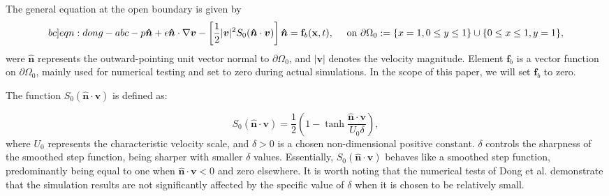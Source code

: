 \documentclass{article}
\numberwithin{equation}{section}
\begin{document}
The general equation at the open boundary is given  by
\begin{equation}\label[bc]{eqn:dong-abc}
-p \boldsymbol{\hat{n}}+\epsilon \boldsymbol{\hat{n}} \cdot \nabla \boldsymbol{v}-\left[\frac{1}{2}|\boldsymbol{v}|^2 S_0(\boldsymbol{\hat{n}} \cdot \boldsymbol{v})\right] \boldsymbol{\hat{n}}=\mathbf{f}_b(\mathbf{x}, t), \quad \text { on } \partial \Omega_0:=\{x=1,0\leq y\leq 1\}\cup \{ 0\leq x \leq 1, y=1\},
\end{equation}
were $\boldsymbol{\hat{n}}$ represents the outward-pointing unit vector normal to $\partial \Omega_0$, and $|\boldsymbol{v}|$ denotes the velocity magnitude. Element $\mathbf{f}_b$ is a vector function on $\partial \Omega_0$, mainly used for numerical testing and set to zero during actual simulations. In the scope of this paper, we will set $\mathbf{f}_b$ to zero. 

The function $S_0(\boldsymbol{\hat{n}} \cdot \boldsymbol{v})$ is defined as:

\begin{equation}
S_0(\boldsymbol{\hat{n}} \cdot \boldsymbol{v})=\frac{1}{2}\left(1-\tanh \frac{\boldsymbol{\hat{n}} \cdot \boldsymbol{v}}{U_0 \delta}\right),
\end{equation}
where $U_0$ represents the characteristic velocity scale, and $\delta>0$ is a chosen non-dimensional positive constant. $\delta$ controls the sharpness of the smoothed step function, being sharper with smaller $\delta$ values. Essentially, $S_0(\boldsymbol{\hat{n}} \cdot \boldsymbol{v})$ behaves like a smoothed step function, predominantly being equal to one when $\boldsymbol{\hat{n}} \cdot \boldsymbol{v}<0$ and zero elsewhere. It is worth noting that the numerical tests of Dong et al. demonstrate that the simulation results are not significantly affected by the specific value of $\delta$ when it is chosen to be relatively small. 
\end{document}
